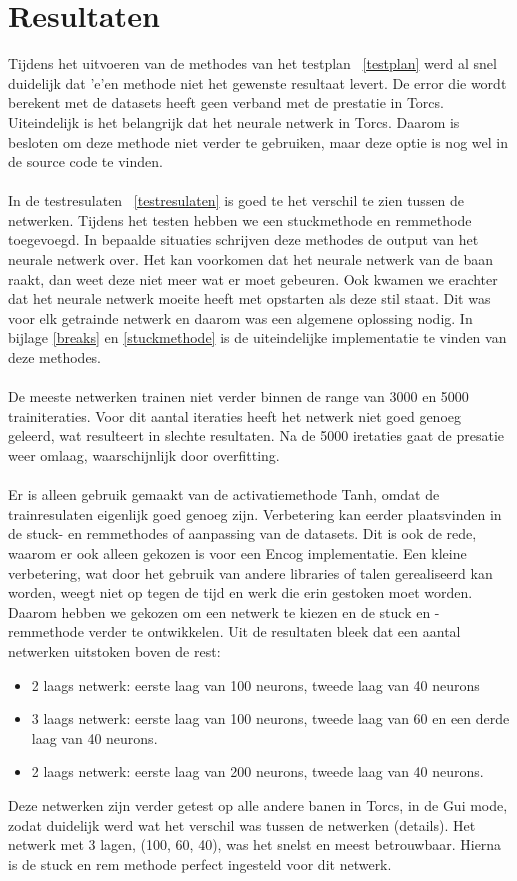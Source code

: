 \documentclass{article}
\begin{document}
\section{Resultaten}
Tijdens het uitvoeren van de methodes van het testplan ~\ref{testplan} werd al snel duidelijk dat 'e'en methode niet het gewenste resultaat levert. De error die wordt berekent met de datasets heeft geen verband met de prestatie in Torcs. Uiteindelijk is het belangrijk dat het neurale netwerk in Torcs. Daarom is besloten om deze methode niet verder te gebruiken, maar deze optie is nog wel in de source code te vinden.  \\\\
In de testresulaten ~\ref{testresulaten} is goed te het verschil te zien tussen de netwerken. Tijdens het testen hebben we een stuckmethode en remmethode toegevoegd. In bepaalde situaties schrijven deze methodes de output van het neurale netwerk over. Het kan voorkomen dat het neurale netwerk van de baan raakt, dan weet deze niet meer wat er moet gebeuren. Ook kwamen we erachter dat het neurale netwerk moeite heeft met opstarten als deze stil staat. Dit was voor elk getrainde netwerk en daarom was een algemene oplossing nodig. In bijlage \ref{breaks} en \ref{stuckmethode} is de uiteindelijke implementatie te vinden van deze methodes. \\\\
De meeste netwerken trainen niet verder binnen de range van 3000 en 5000 trainiteraties. Voor dit aantal iteraties heeft het netwerk niet goed genoeg geleerd, wat resulteert in slechte resultaten. Na de 5000 iretaties gaat de presatie weer omlaag, waarschijnlijk door overfitting. \\\\
Er is alleen gebruik gemaakt van de activatiemethode Tanh, omdat de trainresulaten eigenlijk goed genoeg zijn. Verbetering kan eerder plaatsvinden in de stuck- en remmethodes of aanpassing van de datasets. Dit is ook de rede, waarom er ook alleen gekozen is voor een Encog implementatie. Een kleine verbetering, wat door het gebruik van andere libraries of talen gerealiseerd kan worden, weegt niet op tegen de tijd en werk die erin gestoken moet worden. Daarom hebben we gekozen om een netwerk te kiezen en de stuck en -remmethode verder te ontwikkelen. Uit de resultaten bleek dat een aantal netwerken uitstoken boven de rest:
\begin{itemize}
\item 2 laags netwerk: eerste laag van 100 neurons, tweede laag van 40 neurons
\item 3 laags netwerk: eerste laag van 100 neurons, tweede laag van 60 en een derde laag van 40 neurons.
\item 2 laags netwerk: eerste laag van 200 neurons, tweede laag van 40 neurons. 
\end{itemize}
Deze netwerken zijn verder getest op alle andere banen in Torcs, in de Gui mode, zodat duidelijk werd wat het verschil was tussen de netwerken (details). Het netwerk met 3 lagen, (100, 60, 40), was het snelst en meest betrouwbaar. Hierna is de stuck en rem methode perfect ingesteld voor dit netwerk.
 \pagebreak
\end{document}
